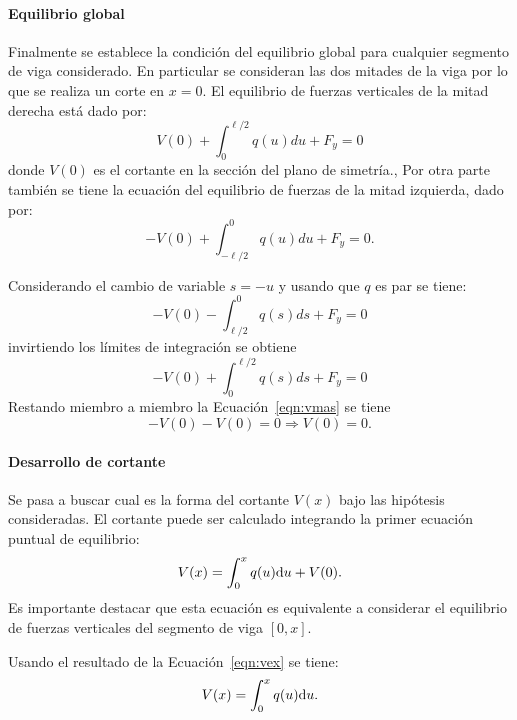 \paragraph{Equilibrio global}
Finalmente se establece la condición del equilibrio global para cualquier segmento de viga considerado. %
%
En particular se consideran las dos mitades de la viga por lo que se realiza un corte en $x=0$. %
%
El equilibrio de fuerzas verticales de la mitad derecha está dado por:
%
\begin{equation}\label{eqn:vmas}
  V(0) + \int_{0}^{\ell/2} q(u) du + F_y = 0
\end{equation}
%
donde $V(0)$ es el cortante en la sección del plano de simetría., %
%
Por otra parte también se tiene la ecuación del equilibrio de fuerzas de la mitad izquierda, dado por:
%
\begin{equation}\label{eqn:vmenos}
  -V(0) + \int_{-\ell/2}^0 q(u) du + F_y = 0.
\end{equation}
%

Considerando el cambio de variable $s=-u$ y usando que $q$ es par se tiene:
\begin{equation}
-V(0) - \int_{\ell/2}^0 q(s) ds + F_y = 0
\end{equation}
invirtiendo los límites de integración se obtiene
%
\begin{equation}
-V(0) + \int_{0}^{\ell/2} q(s) ds + F_y = 0
\end{equation}
Restando miembro a miembro la Ecuación~\eqref{eqn:vmas} se tiene
\begin{equation}\label{eqn:vex}
-V(0) - V(0) = 0\Rightarrow  \boxed{
	V(0) = 0}.
\end{equation}



\paragraph{Desarrollo de cortante}
Se pasa a buscar cual es la forma del cortante $V(x)$ bajo las hipótesis consideradas. %
%
El cortante puede ser calculado integrando la primer ecuación puntual de equilibrio:
%
\begin{equation}
V(x) = \int_{0}^{x} q(u) {\text{d}} u + V(0).
\end{equation}
%
Es importante destacar que esta ecuación es equivalente a considerar el equilibrio de fuerzas verticales del segmento de viga $[0,x]$.


Usando el resultado de la Ecuación~\eqref{eqn:vex} se tiene:
\begin{equation}\label{eqn:v1}
V(x) = \int_{0}^{x} q(u) {\text{d}} u.
\end{equation}

